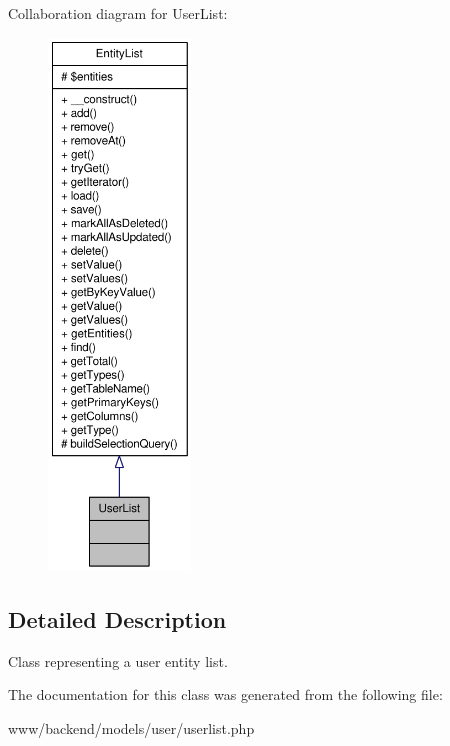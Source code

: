 Collaboration diagram for UserList:\nopagebreak
\begin{figure}[H]
\begin{center}
\leavevmode
\includegraphics[height=400pt]{classUserList__coll__graph}
\end{center}
\end{figure}


\subsection{Detailed Description}
Class representing a user entity list. 

The documentation for this class was generated from the following file:\begin{DoxyCompactItemize}
\item 
www/backend/models/user/userlist.php\end{DoxyCompactItemize}
